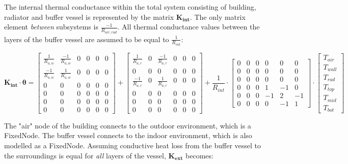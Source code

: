 The internal thermal conductance within the total system consisting of building, radiator and buffer vessel is represented by the matrix $\mathbf{K_{int}}$. The only matrix element \emph{between} subsystems is $\frac{-1}{R_{air,rad}}$. All thermal conductance values between the layers of the buffer vessel are assumed to be equal to $\frac{1}{R_{int}}$:

\begin{equation}
	\mathbf{K_{int}} \cdot \boldsymbol{\theta} = 
	\begin{bmatrix}
		\frac{1}{R_{a,w}} & \frac{-1}{R_{a,w}} & 0 & 0 & 0 & 0 \\
		\frac{-1}{R_{a,w}} & \frac{1}{R_{a,w}} & 0 & 0 & 0 & 0 \\
		0 & 0 & 0 & 0 & 0 & 0 \\
		0 & 0 & 0 & 0 & 0 & 0 \\
		0 & 0 & 0 & 0 & 0 & 0 \\
		0 & 0 & 0 & 0 & 0 & 0  
	\end{bmatrix}
	+
	\begin{bmatrix}
		\frac{1}{R_{a,r}} & 0 & \frac{-1}{R_{a,r}} & 0 & 0 & 0 \\
		0 & 0 & 0 & 0 & 0 & 0 \\
		\frac{-1}{R_{a,r}} & 0 & \frac{1}{R_{a,r}} & 0 & 0 & 0 \\
		0 & 0 & 0 & 0 & 0 & 0 \\
		0 & 0 & 0 & 0 & 0 & 0 \\
		0 & 0 & 0 & 0 & 0 & 0  
	\end{bmatrix}
	+
	\frac{1}{R_{int}} \cdot
	\begin{bmatrix}
		0 & 0 & 0 & 0 & 0 & 0 \\
		0 & 0 & 0 & 0 & 0 & 0 \\
		0 & 0 & 0 & 0 & 0 & 0 \\
		0 & 0 & 0 & 1 & -1 & 0 \\
		0 & 0 & 0 & -1 & 2 & -1 \\
		0 & 0 & 0 & 0 & -1 & 1  
	\end{bmatrix}
	\cdot
	\begin{bmatrix}
		T_{air} \\
		T_{wall} \\
		T_{rad} \\
		T_{top} \\
		T_{mid} \\
		T_{bot}
	\end{bmatrix}
\end{equation}

The "air" node of the building connects to the outdoor environment, which is a \textsf{FixedNode}. The buffer vessel connects to the indoor environment, which is also modelled as a \textsf{FixedNode}. Assuming conductive heat loss from the buffer vessel to the surroundings is equal for \emph{all} layers of the vessel, $\mathbf{K_{ext}}$ becomes:

